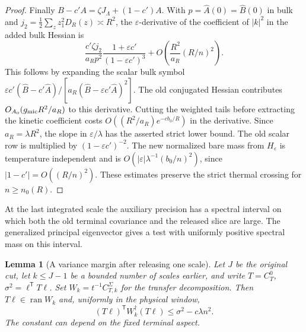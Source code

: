 \documentclass[11pt]{article}
\newtheorem{lemma}[theorem]{Lemma}
\theoremstyle{definition}
\begin{document}
\begin{proof}
Finally \(B-c'A=\zeta J_\Lambda+(1-c')A\). With
\(p=\widehat A(0)=\widehat B(0)\) in bulk and
\(j_2=\tfrac12\sum_z z_1^2D_R(z)\asymp R^2\), the
\(\varepsilon\)-derivative of the coefficient of \(|k|^2\)
in the added bulk Hessian is
\begin{equation}
 \frac{c'\zeta j_2}{a_Rp^2}\frac{1+\varepsilon c'}
 {(1-\varepsilon c')^3}
       +O\!\left(\frac{R^2}{a_R}(R/n)^2\right).
\end{equation}
This follows by expanding the scalar bulk symbol
\(\varepsilon c'(\widehat B-c'\widehat A)/
[a_R(\widehat B-\varepsilon c'\widehat A)^2]\).
The old conjugated Hessian contributes
\(O_{A_0}(g_{\rm mic}R^2/a_R)\) to this derivative. Cutting the
weighted tails before extracting the kinetic coefficient costs
\(O((R^2/a_R)e^{-c b_0/R})\) in the derivative. Since
\(a_R=\lambda R^2\), the slope in \(\varepsilon/\lambda\)
has the asserted strict lower bound. The old scalar row is
multiplied by \((1-\varepsilon c')^{-2}\). The new normalized
bare mass from \(H_\varepsilon\) is temperature independent
and is \(O(|\varepsilon|\lambda^{-1}(b_0/n)^2)\), since
\(|1-c'|=O((R/n)^2)\). These estimates preserve the strict
thermal crossing for \(n\ge n_0(R)\).
\end{proof}

At the last integrated scale the auxiliary precision has a spectral
interval on which both the old terminal covariance and the released
slice are large. The generalized principal eigenvector gives a test
with uniformly positive spectral mass on this interval.

\begin{lemma}[A variance margin after releasing one scale]
\label{lem:aligned-curvature-margin}
Let \(J\) be the original cut, let \(k\le J-1\) be a bounded
number of scales earlier, and write \(T=C^0_T\), \(\sigma^2=
\ell^{\mathsf T}T\ell\). Set \(W_k=t^{-1} C^\Sigma_{T,k}\)
for the transfer decomposition. Then \(T\ell\in\operatorname{ran} W_k\)
and, uniformly in the physical window,
\begin{equation}
 (T\ell)^{\mathsf T}W_k^\dagger(T\ell)
       \le \sigma^2-c\lambda n^2 .
\end{equation}
The constant can depend on the fixed terminal aspect.
\end{lemma}
\end{document}

